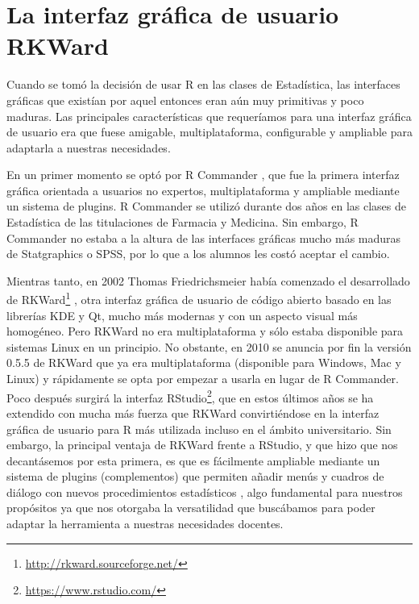 \documentclass[a4paper,10pt,twoside]{article}
\newcommand{\rkward}{\textsf{RKWard}}
\newcommand{\spss}{\textsf{SPSS}}
\newcommand{\statgraphics}{\textsf{Statgraphics}}
\begin{document}
\section{La interfaz gráfica de usuario \rkward}
\label{s:rkward}
Cuando se tomó la decisión de usar R en las clases de Estadística, las interfaces gráficas que existían por aquel
entonces eran aún muy primitivas y poco maduras.
Las principales características que requeríamos para una interfaz gráfica de usuario era que fuese amigable,
multiplataforma, configurable y ampliable para adaptarla a nuestras necesidades.

En un primer momento se optó por \textsf{R Commander} \cite{fox2005r}, que fue la primera interfaz gráfica orientada a
usuarios no expertos, multiplataforma y ampliable mediante un sistema de plugins.
\textsf{R Commander} se utilizó durante dos años en las clases de Estadística de las titulaciones de Farmacia y
Medicina.
Sin embargo, \textsf{R Commander} no estaba a la altura de las interfaces gráficas mucho más maduras de \statgraphics{} o
\spss{}, por lo que a los alumnos les costó aceptar el cambio. 

Mientras tanto, en 2002 Thomas Friedrichsmeier había comenzado el desarrollado de
\rkward{}\footnote{\url{http://rkward.sourceforge.net/}} \cite{rodiger2012rkward}, otra interfaz gráfica de usuario de
código abierto basado en las librerías KDE y Qt, mucho más modernas y con un aspecto visual más homogéneo.
Pero \rkward{} no era multiplataforma y sólo estaba disponible para sistemas Linux en un principio.
No obstante, en 2010 se anuncia por fin la versión 0.5.5 de \rkward{} que ya era multiplataforma (disponible para
Windows, Mac y Linux) y rápidamente se opta por empezar a usarla en lugar de \textsf{R Commander}.
Poco después surgirá la interfaz \textsf{RStudio}\footnote{\url{https://www.rstudio.com/}}, que en estos últimos
años se ha extendido con mucha más fuerza que \rkward{} convirtiéndose en la interfaz gráfica de usuario para R más
utilizada incluso en el ámbito universitario.
Sin embargo, la principal ventaja de \rkward{} frente a \textsf{RStudio}, y que hizo que nos decantásemos por esta
primera, es que es fácilmente ampliable mediante un sistema de plugins (complementos) que permiten añadir menús y
cuadros de diálogo con nuevos procedimientos estadísticos \cite{friedrichsmeier2011introduction}, algo fundamental para
nuestros propósitos ya que nos otorgaba la versatilidad que buscábamos para poder adaptar la herramienta a nuestras
necesidades docentes.
\end{document}
